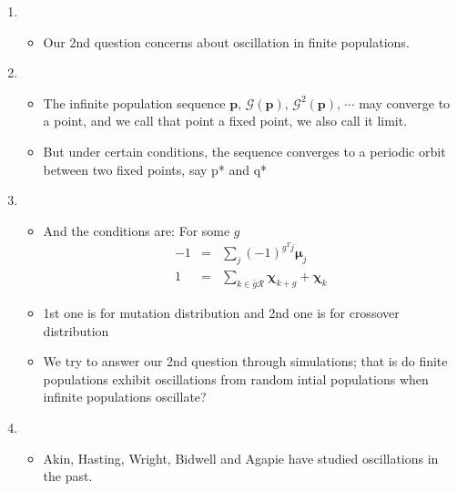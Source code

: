 \documentclass{article}
\begin{document}
\begin{enumerate}
\item 
  \begin{itemize}
  \item Our 2nd question concerns about oscillation in
    finite populations.
  \end{itemize}
    
\item
  \begin{itemize}
  \item The infinite population sequence  $\bm{p}, \, \mathcal{G}(\bm{p}), \, {\mathcal{G}}^2(\bm{p}), \, \cdots$ may
    converge to a point, and we call that point a fixed point, we also call it limit.
  \item But under certain conditions, the sequence converges to a
    periodic orbit between two fixed points, say p* and q*
\end{itemize}

\item
  \begin{itemize}
  \item And the conditions are: For some $g$
  \begin{eqnarray*}
      -1 &=& \sum \limits_{j} (-1)^{g^T j} \bm{\mu}_j \\
      1 &=& \sum \limits_{k \in \bar{g}\mathcal{R}} \bm{\chi}_{k+g} + \bm{\chi}_k 
      \end{eqnarray*}
  \item 1st one is for mutation distribution and 2nd one is for crossover distribution
  \item We try to answer our 2nd question through simulations; that is do finite populations exhibit
     oscillations from random intial populations when infinite populations oscillate?
  \end{itemize}
    
\item
  \begin{itemize}
    \item Akin, Hasting, Wright, Bidwell and Agapie have studied oscillations in the past.
  \end{itemize}


\end{enumerate}
\end{document}
